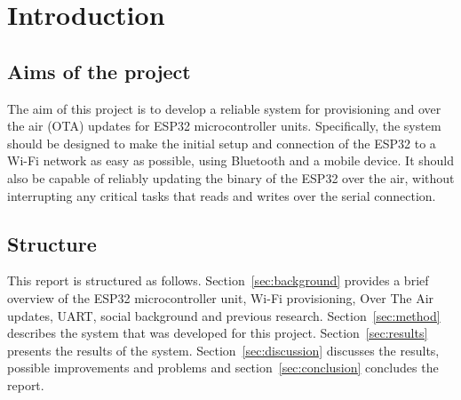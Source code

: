 \section{Introduction}\label{sec:introduction}

\subsection{Aims of the project}\label{sec:aims}
The aim of this project is to develop a reliable system for provisioning and over the air (OTA) updates for ESP32 microcontroller units. Specifically, the system should be designed to make the initial setup and connection of the ESP32 to a Wi-Fi network as easy as possible, using Bluetooth and a mobile device. It should also be capable of reliably updating the binary of the ESP32 over the air, without interrupting any critical tasks that reads and writes over the serial connection.

\subsection{Structure}\label{sec:structure}
This report is structured as follows. Section~\ref{sec:background} provides a brief overview of the ESP32 microcontroller unit, Wi-Fi provisioning, Over The Air updates, UART, social background and previous research. Section~\ref{sec:method} describes the system that was developed for this project. Section~\ref{sec:results} presents the results of the system. Section~\ref{sec:discussion} discusses the results, possible improvements and problems and section~\ref{sec:conclusion} concludes the report.